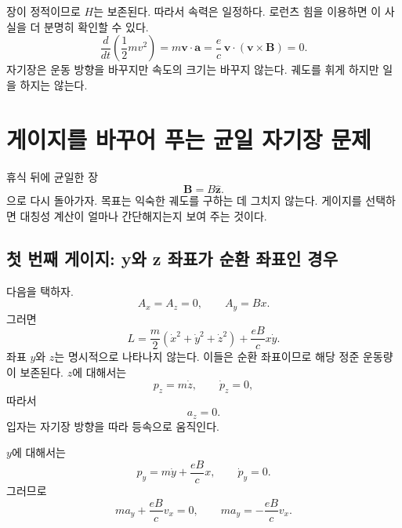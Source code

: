 장이 정적이므로 \(H\)는 보존된다. 따라서 속력은 일정하다. 로런츠 힘을 이용하면 이 사실을 더 분명히 확인할 수 있다.
\begin{equation}
  \frac{d}{dt}\left(\frac12mv^2\right)
  =
  m\mathbf v\cdot\mathbf a
  =
  \frac{e}{c}\,
  \mathbf v\cdot(\mathbf v\times\mathbf B)
  =0.
\end{equation}
자기장은 운동 방향을 바꾸지만 속도의 크기는 바꾸지 않는다. 궤도를 휘게 하지만 일을 하지는 않는다.

\section{게이지를 바꾸어 푸는 균일 자기장 문제}

휴식 뒤에 균일한 장
\begin{equation}
  \mathbf B=B\hat{\mathbf z}.
\end{equation}
으로 다시 돌아가자. 목표는 익숙한 궤도를 구하는 데 그치지 않는다. 게이지를 선택하면 대칭성 계산이 얼마나 간단해지는지 보여 주는 것이다.

\subsection{첫 번째 게이지: y와 z 좌표가 순환 좌표인 경우}

다음을 택하자.
\begin{equation}
  A_x=A_z=0,
  \qquad
  A_y=Bx.
\end{equation}
그러면
\begin{equation}
  L
  =
  \frac{m}{2}
  \left(\dot x^2+\dot y^2+\dot z^2\right)
  +
  \frac{eB}{c}x\dot y.
\end{equation}
좌표 \(y\)와 \(z\)는 명시적으로 나타나지 않는다. 이들은 순환 좌표이므로 해당 정준 운동량이 보존된다. \(z\)에 대해서는
\begin{equation}
  p_z=m\dot z,
  \qquad
  \dot p_z=0,
\end{equation}
따라서
\begin{equation}
  a_z=0.
\end{equation}
입자는 자기장 방향을 따라 등속으로 움직인다.

\(y\)에 대해서는
\begin{equation}
  p_y=m\dot y+\frac{eB}{c}x,
  \qquad
  \dot p_y=0.
\end{equation}
그러므로
\begin{equation}
  m a_y+\frac{eB}{c}v_x=0,
  \qquad
  \boxed{m a_y=-\frac{eB}{c}v_x}.
\end{equation}

